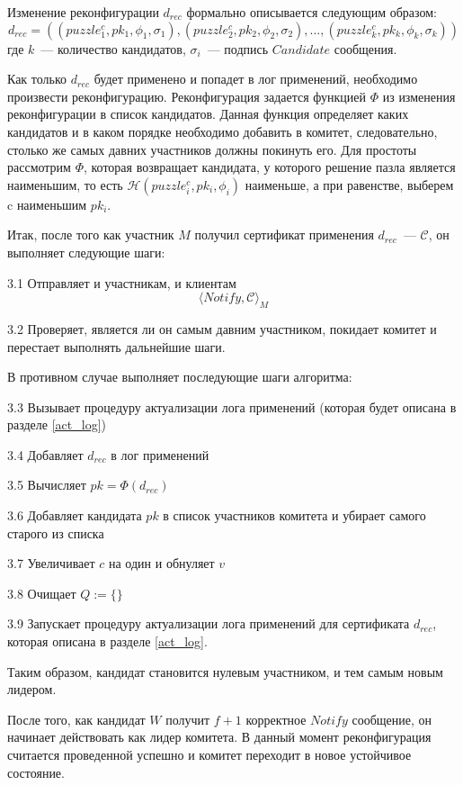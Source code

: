 Изменение реконфигурации $d_{rec}$ формально описывается следующим образом:
$$d_{rec}=((puzzle^c_1, pk_1, \phi_1, \sigma_1), (puzzle^c_2, pk_2, \phi_2, \sigma_2),...,(puzzle^c_k, pk_k, \phi_k, \sigma_k))$$
где $k$~--- количество кандидатов, $\sigma_i$~--- подпись $Candidate$ сообщения.

Как только $d_{rec}$ будет применено и попадет в лог применений, необходимо произвести реконфигурацию.
Реконфигурация задается функцией $\Phi$ из изменения реконфигурации в список кандидатов. Данная функция определяет каких кандидатов и в каком порядке необходимо добавить в комитет, следовательно, столько же самых давних участников должны покинуть его. Для простоты рассмотрим $\Phi$, которая возвращает кандидата, у которого решение пазла является наименьшим, то есть $\mathcal{H}(puzzle^c_i, pk_i, \phi_i)$ наименьше, а при равенстве, выберем c наименьшим $pk_i$.

Итак, после того как участник $M$ получил сертификат применения $d_{rec}$~--- $\mathcal{C}$, он выполняет следующие шаги:

3.1 Отправляет и участникам, и клиентам
 \[ \langle Notify, \mathcal{C} \rangle_M \]

3.2 Проверяет, является ли он самым давним участником, покидает комитет и перестает выполнять дальнейшие шаги. 

В противном случае выполняет последующие шаги алгоритма:

3.3 Вызывает процедуру актуализации лога применений (которая будет описана в разделе \ref{act_log})

3.4 Добавляет $d_{rec}$ в лог применений

3.5 Вычисляет $pk=\Phi(d_{rec})$

3.6 Добавляет кандидата $pk$ в список участников комитета и убирает самого старого из списка

3.7 Увеличивает $c$ на один и обнуляет $v$

3.8 Очищает $Q := \{\}$

3.9 Запускает процедуру актуализации лога применений для сертификата $d_{rec}$, которая описана в разделе \ref{act_log}.

Таким образом, кандидат становится нулевым участником, и тем самым новым лидером.

\vspace{10pt}

После того, как кандидат $W$ получит $f+1$ корректное $Notify$ сообщение, он начинает действовать как лидер комитета. В данный момент реконфигурация считается проведенной успешно и комитет переходит в новое устойчивое состояние.

